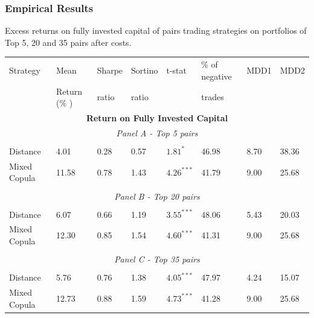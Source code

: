 \documentclass[pdf,9pt,xcolor=dvipsnames,hide notes]{beamer}
\begin{document}
\begin{frame}
	\frametitle{Empirical Results}
	\begin{threeparttable}[H]
		\centering \tiny
		\caption{Excess returns on fully invested capital of pairs trading strategies on portfolios of Top 5, 20 and 35 pairs after costs. }
		\begin{tabularx}{\textwidth}{@{\extracolsep{\fill}}llllllll@{}}
			\toprule
			Strategy & Mean  & Sharpe & Sortino & t-stat & \% of negative   & MDD1 & MDD2 \\
			& Return (\% ) & ratio &  ratio     &  &  trades     &       &  \\
			\midrule
			\multicolumn{8}{c}{\textbf{Return on Fully Invested Capital}} \\
			\multicolumn{8}{c}{\textit{Panel A - Top 5 pairs}} \\
			&       &       &       &       &       &       &  \\
			Distance & 4.01  & 0.28  & 0.57  & $1.81^{*}$  & 46.98 & 8.70    & 38.36  \\
			Mixed Copula & 11.58  & 0.78  & 1.43  & $4.26^{***}$  & 41.79 & 9.00  & 25.68 \\
			\multicolumn{1}{r}{} & \multicolumn{1}{r}{} & \multicolumn{1}{r}{} & \multicolumn{1}{r}{} & \multicolumn{1}{r}{} & \multicolumn{1}{r}{} & \multicolumn{1}{r}{} & \multicolumn{1}{r}{} \\
			\multicolumn{8}{c}{\textit{Panel B - Top 20 pairs}} \\
			&       &       &       &       &       &       &  \\
			Distance & 6.07  & 0.66  & 1.19  & $3.55^{***}$  & 48.06 & 5.43  & 20.03 \\
			Mixed Copula  & 12.30  & 0.85  & 1.54  & $4.60^{***}$  & 41.31 & 9.00  & 25.68  \\
			\multicolumn{1}{r}{} & \multicolumn{1}{r}{} & \multicolumn{1}{r}{} & \multicolumn{1}{r}{} & \multicolumn{1}{r}{} & \multicolumn{1}{r}{} & \multicolumn{1}{r}{} & \multicolumn{1}{r}{} \\
			\multicolumn{8}{c}{\textit{Panel C - Top 35 pairs}} \\
			&       &       &       &       &       &       &  \\
			Distance & 5.76  & 0.76  & 1.38  & $4.05^{***}$  & 47.97 & 4.24  & 15.07 \\
			Mixed Copula & 12.73  & 0.88  & 1.59  & $4.73^{***}$  & 41.28 & 9.00  & 25.68  \\

\end{tabularx}
\end{threeparttable}
\end{frame}
\end{document}

